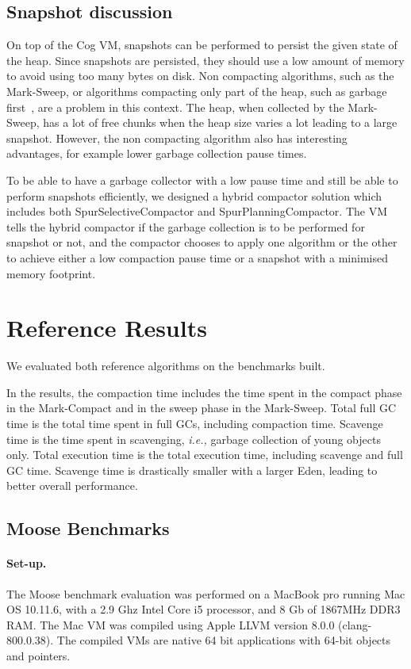 \documentclass[10pt, sigplan]{acmart}
\begin{document}
\subsection{Snapshot discussion}

On top of the Cog VM, snapshots can be performed to persist the given state of the heap. Since snapshots are persisted, they should use a low amount of memory to avoid using too many bytes on disk. Non compacting algorithms, such as the Mark-Sweep, or algorithms compacting only part of the heap, such as garbage first~\cite{G1}, are a problem in this context. The heap, when collected by the Mark-Sweep, has a lot of free chunks when the heap size varies a lot leading to a large snapshot. However, the non compacting algorithm also has interesting advantages, for  example lower garbage collection pause times. 

To be able to have a garbage collector with a low pause time and still be able to perform snapshots efficiently, we designed a hybrid compactor solution which includes both SpurSelectiveCompactor and SpurPlanningCompactor. The VM tells the hybrid compactor if the garbage collection is to be performed for snapshot or not, and the compactor chooses to apply one algorithm or the other to achieve either a low compaction pause time or a snapshot with a minimised memory footprint.

\section{Reference Results} \label{sec:valid}

We evaluated both reference algorithms on the benchmarks built. 

In the results, the compaction time includes the time spent in the compact phase in the Mark-Compact and in the sweep phase in the Mark-Sweep. Total full GC time is the total time spent in full GCs, including  compaction time. Scavenge time is the time spent in scavenging, \emph{i.e.,} garbage collection of young objects only. Total execution time is the total execution time, including scavenge and full GC time. Scavenge time is drastically smaller with a larger Eden, leading to better overall performance.

\subsection{Moose Benchmarks}


\paragraph{Set-up.}The Moose benchmark evaluation was performed on a MacBook pro running Mac OS 10.11.6, with a 2.9 Ghz Intel Core i5 processor, and 8 Gb of  1867MHz DDR3 RAM. The Mac VM was compiled using Apple LLVM version 8.0.0 (clang-800.0.38). The compiled VMs are native 64 bit applications with 64-bit objects and pointers.
\end{document}
